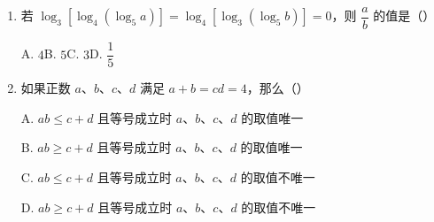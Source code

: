 \documentclass[a4paper,11pt]{article}
\begin{document}
\begin{enumerate}
\item 若 $\log_3[\log_4(\log_5 a)]=\log_4[\log_3(\log_5 b)]=0$，则 $\dfrac ab$ 的值是\mbox{（\quad）}

\keepwithprev
A. $4$\qquad\qquad B. $5$\qquad\qquad C. $3$\qquad\qquad D. $\dfrac15$

\ifanswer
\solbegin
{}
\solend
\fi

\item 如果正数 $a$、$b$、$c$、$d$ 满足 $a+b=cd=4$，那么\mbox{（\quad）}

\keepwithprev
A. $ab\leqslant c+d$ 且等号成立时 $a$、$b$、$c$、$d$ 的取值唯一

B. $ab\geqslant c+d$ 且等号成立时 $a$、$b$、$c$、$d$ 的取值唯一

C. $ab\leqslant c+d$ 且等号成立时 $a$、$b$、$c$、$d$ 的取值不唯一

D. $ab\geqslant c+d$ 且等号成立时 $a$、$b$、$c$、$d$ 的取值不唯一

\ifanswer
\solbegin
{}
\solend
\fi

\end{enumerate}

\end{document}
